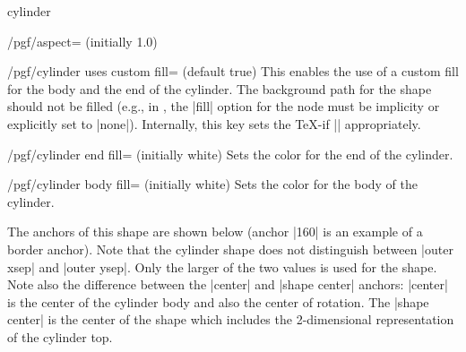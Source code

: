 \begin{shape}{cylinder}
\begin{key}{/pgf/aspect= (initially 1.0)}
\end{key}

\begin{key}{/pgf/cylinder uses custom fill= (default true)}
	This enables the use of a custom fill for the body and the end of
	the cylinder. The background path for the shape should not be
	filled (e.g., in \tikzname{}, the |fill| option for the node must
	be implicity or explicitly set to |none|).
  Internally, this key sets the \TeX-if
  |\ifpgfcylinderusescustomfill| appropriately.
\end{key}

\begin{codeexample}[]
\end{codeexample}

\begin{key}{/pgf/cylinder end fill= (initially white)}
	Sets the color for the end of the cylinder.
\end{key}
\begin{key}{/pgf/cylinder body fill= (initially white)}
	Sets the color for the body of the cylinder.
\end{key}


  The anchors of this shape are shown below (anchor |160| is an
	example of a border anchor). Note that the cylinder shape does not
	distinguish between |outer xsep| and |outer ysep|. Only the larger
	of the two values is used for the shape. Note also the difference
	between the |center| and |shape center| anchors: |center| is the
	center of the cylinder body and also the center of rotation.
	The |shape center| is the center of the shape which includes the
	2-dimensional representation of the cylinder top.	
	

\begin{codeexample}[]
\Huge
{}
\end{codeexample}


\end{shape}






